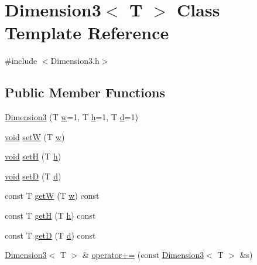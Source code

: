 \hypertarget{class_dimension3}{\section{Dimension3$<$ T $>$ Class Template Reference}
\label{class_dimension3}
}


{\ttfamily \#include $<$Dimension3.\-h$>$}

\subsection*{Public Member Functions}
\begin{DoxyCompactItemize}
\item 
\hyperlink{class_dimension3_a5e3f43113a7c0be7d5c1c8cf4725c405}{Dimension3} (T \hyperlink{gl3_8h_a1d0296e9e835f2e1ee17634af95fc1ec}{w}=1, T \hyperlink{class_dimension3_a494359bfb95754b21a982dcbbec08081}{h}=1, T \hyperlink{class_dimension3_ab17337b8f1b45b46498768809bdaeacb}{d}=1)
\item 
\hyperlink{glutf90_8h_ac778d6f63f1aaf8ebda0ce6ac821b56e}{void} \hyperlink{class_dimension3_ada80a6460a489762ed26d0b1cf46ee40}{set\-W} (T \hyperlink{gl3_8h_a1d0296e9e835f2e1ee17634af95fc1ec}{w})
\item 
\hyperlink{glutf90_8h_ac778d6f63f1aaf8ebda0ce6ac821b56e}{void} \hyperlink{class_dimension3_a31c892a733db8fa08142f8af8e421f36}{set\-H} (T \hyperlink{class_dimension3_a494359bfb95754b21a982dcbbec08081}{h})
\item 
\hyperlink{glutf90_8h_ac778d6f63f1aaf8ebda0ce6ac821b56e}{void} \hyperlink{class_dimension3_a7fd4e79e62e16c562d60757ff427d896}{set\-D} (T \hyperlink{class_dimension3_ab17337b8f1b45b46498768809bdaeacb}{d})
\item 
const T \hyperlink{class_dimension3_a3e4a4bf84c801ede237299668b794173}{get\-W} (T \hyperlink{gl3_8h_a1d0296e9e835f2e1ee17634af95fc1ec}{w}) const 
\item 
const T \hyperlink{class_dimension3_a46ac66024dfaff3f907400250197b0b0}{get\-H} (T \hyperlink{class_dimension3_a494359bfb95754b21a982dcbbec08081}{h}) const 
\item 
const T \hyperlink{class_dimension3_af201295958148b55bad8efac8d74f725}{get\-D} (T \hyperlink{class_dimension3_ab17337b8f1b45b46498768809bdaeacb}{d}) const 
\item 
\hyperlink{class_dimension3}{Dimension3}$<$ T $>$ \& \hyperlink{class_dimension3_ac0c244df8ae0fceadb05acd680648ede}{operator+=} (const \hyperlink{class_dimension3}{Dimension3}$<$ T $>$ \&s)

\end{DoxyCompactItemize}

